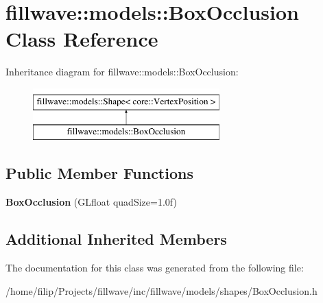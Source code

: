 \hypertarget{classfillwave_1_1models_1_1BoxOcclusion}{}\section{fillwave\+:\+:models\+:\+:Box\+Occlusion Class Reference}
\label{classfillwave_1_1models_1_1BoxOcclusion}
Inheritance diagram for fillwave\+:\+:models\+:\+:Box\+Occlusion\+:\begin{figure}[H]
\begin{center}
\leavevmode
\includegraphics[height=2.000000cm]{classfillwave_1_1models_1_1BoxOcclusion}
\end{center}
\end{figure}
\subsection*{Public Member Functions}
\begin{DoxyCompactItemize}
\item 
\hypertarget{classfillwave_1_1models_1_1BoxOcclusion_a5905ef16915b6a4a8e087b9a68b692e5}{}{\bfseries Box\+Occlusion} (G\+Lfloat quad\+Size=1.\+0f)\label{classfillwave_1_1models_1_1BoxOcclusion_a5905ef16915b6a4a8e087b9a68b692e5}

\end{DoxyCompactItemize}
\subsection*{Additional Inherited Members}


The documentation for this class was generated from the following file\+:\begin{DoxyCompactItemize}
\item 
/home/filip/\+Projects/fillwave/inc/fillwave/models/shapes/Box\+Occlusion.\+h\end{DoxyCompactItemize}
